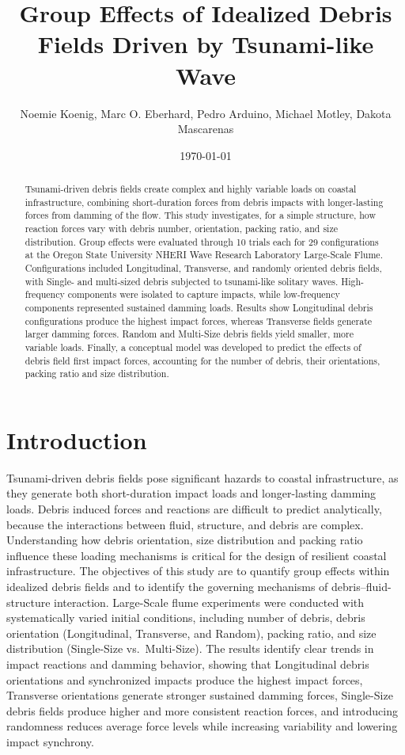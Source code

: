 \documentclass[10pt,a4paper]{article}
\title{Group Effects of Idealized Debris Fields Driven by Tsunami-like Wave}
\author{Noemie Koenig, Marc O. Eberhard, Pedro Arduino, Michael Motley, Dakota Mascarenas}
\date{\today}
\begin{document}
\maketitle
\begin{abstract}
Tsunami-driven debris fields create complex and highly variable loads on coastal infrastructure, combining short-duration forces from debris impacts with longer-lasting forces from damming of the flow. This study investigates, for a simple structure, how reaction forces vary with debris number, orientation, packing ratio, and size distribution. Group effects were evaluated through 10 trials each for 29 configurations at the Oregon State University NHERI Wave Research Laboratory Large-Scale Flume. Configurations included Longitudinal, Transverse, and randomly oriented debris fields, with Single- and multi-sized debris subjected to tsunami-like solitary waves. High-frequency components were isolated to capture impacts, while low-frequency components represented sustained damming loads. Results show Longitudinal debris configurations produce the highest impact forces, whereas Transverse fields generate larger damming forces. Random and Multi-Size debris fields yield smaller, more variable loads. Finally, a conceptual model was developed to predict the effects of debris field first impact forces, accounting for the number of debris, their orientations, packing ratio and size distribution.
\end{abstract}

\section{Introduction}
Tsunami-driven debris fields pose significant hazards to coastal infrastructure, as they generate both short-duration impact loads and longer-lasting damming loads. Debris induced forces and reactions are difficult to predict analytically, because the interactions between fluid, structure, and debris are complex. Understanding how debris orientation, size distribution and packing ratio influence these loading mechanisms is critical for the design of resilient coastal infrastructure. The objectives of this study are to quantify group effects within idealized debris fields and to identify the governing mechanisms of debris–fluid-structure interaction. Large-Scale flume experiments were conducted with systematically varied initial conditions, including number of debris, debris orientation (Longitudinal, Transverse, and Random), packing ratio, and size distribution (Single-Size vs.\ Multi-Size). The results identify clear trends in impact reactions and damming behavior, showing that Longitudinal debris orientations and synchronized impacts produce the highest impact forces, Transverse orientations generate stronger sustained damming forces, Single-Size debris fields produce higher and more consistent reaction forces, and introducing randomness reduces average force levels while increasing variability and lowering impact synchrony.
\end{document}
